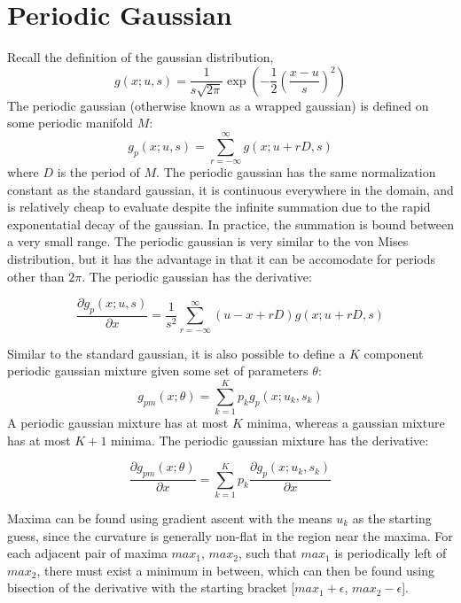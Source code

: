 \documentclass{acm_proc_article-sp}
\begin{document}
\section{Periodic Gaussian}
Recall the definition of the gaussian distribution,
\begin{equation}
g(x; u,s) = \dfrac{1}{s\sqrt{2\pi}} \exp\left(-\dfrac{1}{2} \left(\dfrac{x-u}{s}\right)^2\right)
\end{equation}
The periodic gaussian (otherwise known as a wrapped gaussian) is defined on some periodic manifold \textbf{$M$}:
\begin{equation}
g_p(x; u,s) = \sum_{r=-\infty}^{\infty} g(x; u+rD, s)
\end{equation}
where \textbf{$D$} is the period of \textbf{$M$}. The periodic gaussian has the same normalization constant as the standard gaussian, it is continuous everywhere in the domain, and is relatively cheap to evaluate despite the infinite summation due to the rapid exponentatial decay of the gaussian. In practice, the summation is bound between a very small range. The periodic gaussian is very similar to the von Mises distribution, but it has the advantage in that it can be accomodate for periods other than \textbf{$2\pi$}. The periodic gaussian has the derivative:

\begin{equation}
\dfrac{\partial g_p(x;u,s)}{\partial x} = \dfrac{1}{s^2} \sum_{r=-\infty}^{\infty} (u-x+rD) g(x; u+rD, s)
\end{equation}

Similar to the standard gaussian, it is also possible to define a \textbf{$K$} component periodic gaussian mixture given some set of parameters \textbf{$\theta$}:
\begin{equation}
g_{pm}(x;\theta) = \sum_{k=1}^{K} p_k g_p(x; u_k, s_k)
\end{equation}
A periodic gaussian mixture has at most \textbf{$K$} minima, whereas a gaussian mixture has at most \textbf{$K+1$} minima. The periodic gaussian mixture has the derivative:

\begin{equation}
\dfrac{\partial g_{pm}(x; \theta)}{\partial x} =  \sum_{k=1}^{K} p_k \dfrac{\partial g_p(x; u_k, s_k)}{\partial x}
\end{equation}

Maxima can be found using gradient ascent with the means $u_k$ as the starting guess, since the curvature is generally non-flat in the region near the maxima. For each adjacent pair of maxima $max_1$,  $max_2$, such that $max_1$ is periodically left of $max_2$, there must exist a minimum in between, which can then be found using bisection of the derivative with the starting bracket [$max_1+\epsilon$, $max_2-\epsilon$].
\end{document}
